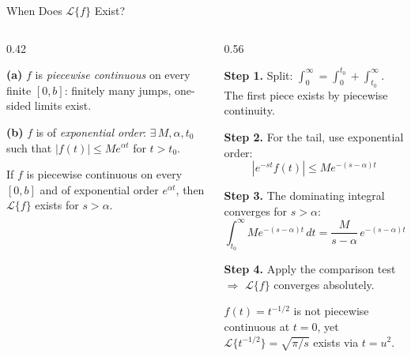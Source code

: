 \documentclass[aspectratio=169,11pt]{beamer}
\begin{document}
\begin{frame}{When Does $\mathcal{L}\{f\}$ Exist?}
\footnotesize
\begin{columns}[T]
\begin{column}{0.42\textwidth}
\begin{formulabox}
\textbf{(a)} $f$ is \emph{piecewise continuous} on every finite $[0,b]$: finitely many jumps, one-sided limits exist.

\medskip
\textbf{(b)} $f$ is of \emph{exponential order}: $\exists\, M, \alpha, t_0$ such that $|f(t)| \le M e^{\alpha t}$ for $t > t_0$.
\end{formulabox}
\vspace{0.5mm}
\begin{conceptbox}
If $f$ is piecewise continuous on every $[0,b]$ and of exponential order $e^{\alpha t}$, then $\mathcal{L}\{f\}$ exists for $s > \alpha$.
\end{conceptbox}
\end{column}
\begin{column}{0.56\textwidth}
\begin{methodbox}
\textbf{Step 1.} Split: $\int_0^{\infty} = \int_0^{t_0} + \int_{t_0}^{\infty}$. The first piece exists by piecewise continuity.

\textbf{Step 2.} For the tail, use exponential order:
\[|e^{-st}f(t)| \le M e^{-(s-\alpha)t}\]

\textbf{Step 3.} The dominating integral converges for $s > \alpha$:
\[\int_{t_0}^{\infty} M e^{-(s-\alpha)t}\,dt = \frac{M}{s-\alpha}\,e^{-(s-\alpha)t_0}\]

\textbf{Step 4.} Apply the comparison test $\Rightarrow$ $\mathcal{L}\{f\}$ converges absolutely.
\end{methodbox}
\vspace{0.5mm}
\begin{warningbox}
$f(t) = t^{-1/2}$ is not piecewise continuous at $t=0$, yet $\mathcal{L}\{t^{-1/2}\} = \sqrt{\pi/s}$ exists via $t = u^2$.
\end{warningbox}
\end{column}
\end{columns}
\end{frame}
\end{document}
